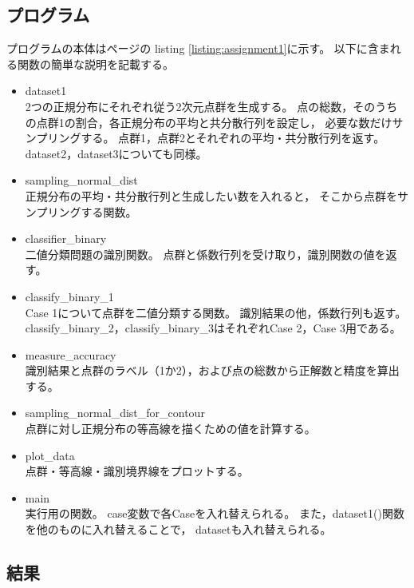 \documentclass[class=jsarticle, crop=false, dvipdfmx, fleqn]{standalone}
\begin{document}
\subsection*{プログラム}

プログラムの本体は\pageref{listing:assignment1}ページの
listing \ref{listing:assignment1}に示す。
以下に含まれる関数の簡単な説明を記載する。

\begin{itemize}
    \item dataset1 \\
        2つの正規分布にそれぞれ従う2次元点群を生成する。
        点の総数，そのうちの点群1の割合，各正規分布の平均と共分散行列を設定し，
        必要な数だけサンプリングする。
        点群1，点群2とそれぞれの平均・共分散行列を返す。
        dataset2，dataset3についても同様。
    \item sampling\_normal\_dist \\
        正規分布の平均・共分散行列と生成したい数を入れると，
        そこから点群をサンプリングする関数。
    \item classifier\_binary \\
        二値分類問題の識別関数。
        点群と係数行列を受け取り，識別関数の値を返す。
    \item classify\_binary\_1 \\
        Case 1について点群を二値分類する関数。
        識別結果の他，係数行列も返す。
        classify\_binary\_2，classify\_binary\_3はそれぞれCase 2，Case 3用である。
    \item measure\_accuracy \\
        識別結果と点群のラベル（1か2），および点の総数から正解数と精度を算出する。
    \item sampling\_normal\_dist\_for\_contour \\
        点群に対し正規分布の等高線を描くための値を計算する。
    \item plot\_data \\
        点群・等高線・識別境界線をプロットする。
    \item main \\
        実行用の関数。
        case変数で各Caseを入れ替えられる。
        また，dataset1()関数を他のものに入れ替えることで，
        datasetも入れ替えられる。
\end{itemize}



\subsection*{結果}
\end{document}
